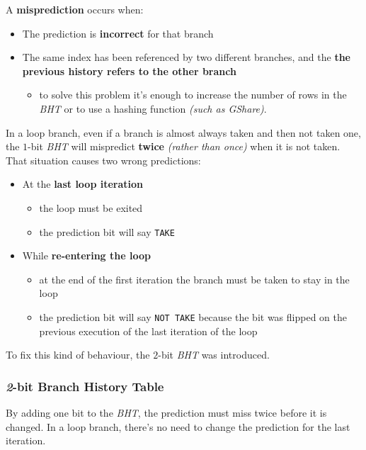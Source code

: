 \documentclass[english]{article}
\begin{document}
A \textbf{misprediction} occurs when:

\begin{itemize}
  \item The prediction is \textbf{incorrect} for that branch
  \item The same index has been referenced by two different branches, and the \textbf{the previous history refers to the other branch}
        \begin{itemize}
          \item to solve this problem it's enough to increase the number of rows in the \textit{BHT} or to use a hashing function \textit{(such as  GShare)}.
        \end{itemize}
\end{itemize}

\bigskip
In a loop branch, even if a branch is almost always taken and then not taken one, the \(1\)-bit \textit{BHT} will mispredict \textbf{twice} \textit{(rather than once)} when it is not taken.
That situation causes two wrong predictions:
\begin{itemize}
  \item At the \textbf{last loop iteration}
        \begin{itemize}
          \item the loop must be exited
          \item the prediction bit will say \texttt{TAKE}
        \end{itemize}
  \item While \textbf{re-entering the loop}
        \begin{itemize}
          \item at the end of the first iteration the branch must be taken to stay in the loop
          \item the prediction bit will say \texttt{NOT TAKE} because the bit was flipped on the previous execution of the last iteration of the loop
        \end{itemize}
\end{itemize}

To fix this kind of behaviour, the \(2\)-bit \textit{BHT} was introduced.

\subsubsection{\textit{2}-bit Branch History Table}

By adding one bit to the \textit{BHT}, the prediction must miss twice before it is changed.
In a loop branch, there's no need to change the prediction for the last iteration.
\end{document}
